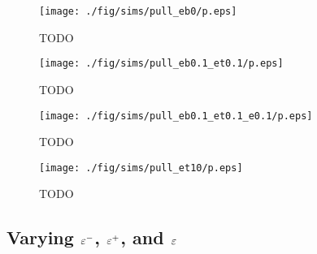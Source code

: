 	\begin{figure}
		\begin{center}
			\texttt{[image: ./fig/sims/pull\_eb0/p.eps]}
		\end{center}		
		\caption{ TODO
		\label{fig:PullGrid:eb0}}
	\end{figure}
	
	\begin{figure}
		\begin{center}
			\texttt{[image: ./fig/sims/pull\_eb0.1\_et0.1/p.eps]}
		\end{center}		
		\caption{ TODO
		\label{fig:PullGrid:eb0.1_et0.1}}
	\end{figure}
	
	\begin{figure}
		\begin{center}
			\texttt{[image: ./fig/sims/pull\_eb0.1\_et0.1\_e0.1/p.eps]}
		\end{center}		
		\caption{ TODO
		\label{fig:PullGrid:eb0.1_et0.1_e0.1}}
	\end{figure}
	
	\begin{figure}
		\begin{center}
			\texttt{[image: ./fig/sims/pull\_et10/p.eps]}
		\end{center}		
		\caption{ TODO
		\label{fig:PullGrid:et10}}
	\end{figure}

\subsection{Varying $\varepsilon^-$, $\varepsilon^+$, and $\varepsilon$} \label{section:detachment:eps}

